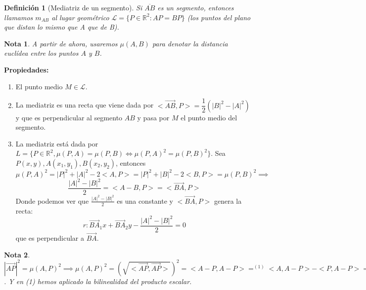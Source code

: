 \documentclass[11pt, a4paper, titlepage]{article}
\makeatletter
\renewenvironment{proof}[1][\proofname] {\vspace{-15pt}\par\pushQED{\qed}\normalfont\topsep6\p@\@plus6\p@\relax\trivlist\item[\hskip\labelsep\it#1\@addpunct{.}]\ignorespaces}{\popQED\endtrivlist\@endpefalse}
\newcommand{\R}{\mathbb{R}}
\renewcommand{\vec}{\overrightarrow}
\theoremstyle{theorem-style}
\theoremstyle{definition-style}
\newtheorem*{ndef}{Definición}
\theoremstyle{remark-style}
\newtheorem*{nota}{Nota}
\theoremstyle{example-style}
\newenvironment{nlist}
{\begin{enumerate}
    \renewcommand\labelenumi{(\emph{\roman{enumi})}}}
  {\end{enumerate}}
\makeatother
\begin{document}
\begin{ndef}[Mediatriz de un segmento]
  Si $\overline{AB}$ es un segmento, entonces llamamos $m_{AB}$  al lugar geométrico $\mathcal{L}=\{P \in \R^2 : AP = BP\}$ (los puntos del plano que distan lo mismo que A que de B).
\end{ndef}

\begin{center}
\end{center}

\begin{nota}
  A partir de ahora, usaremos $\mu(A,B)$ para denotar la distancia euclídea entre los puntos $A$ y $B$.
\end{nota}

\textbf{Propiedades:}
\begin{nlist}
\item El punto medio $M \in \mathcal{L}$. 
\item La mediatriz es una recta que viene dada por $<\vec{AB},P> = \dfrac{1}{2}(|B|^2-|A|^2)$ y que es perpendicular al segmento $AB$ y pasa por $M$ el punto medio del segmento.\\
  \begin{proof}
    La mediatriz está dada por $L = \{P\in\mathbb{R}^2, \mu(P,A) = \mu(P,B)\iff \mu(P,A)^2 = \mu(P,B)^2\}$. Sea $P(x,y),A(x_1,y_1),B(x_2,y_2)$, entonces $\mu(P,A)^2 = |P|^2+|A|^2-2<A,P> = |P|^2+|B|^2-2<B,P>= \mu(P,B)^2 \implies$ $$ \frac{|A|^2-|B|^2}{2} =<A-B,P> = <\vec{BA},P>$$
    Donde podemos ver que $\frac{|A|^2-|B|^2}{2}$ es una constante y $<\vec{BA},P>$ genera la recta:
    \[
      r: \vec{BA}_1x+ \vec{BA}_2y - \frac{|A|^2-|B|^2}{2} = 0
    \]
    que es perpendicular a $\vec{BA}$.
  \end{proof}
\end{nlist}
\begin{nota}
  $|\vec{AP}|^2 = \mu(A,P)^2\implies \mu(A,P)^2 = (\sqrt{<\vec{AP},\vec{AP}>})^2 =  < A-P, A-P>  =^{(1)} <A,A-P>-<P,A-P> = <A,A> -<A,P>+<P,P>-<P,A>  = |A|^2+|P|^2-2<P,A>$. Y en (1) hemos aplicado la bilinealidad del producto escalar.
\end{nota}
\end{document}
